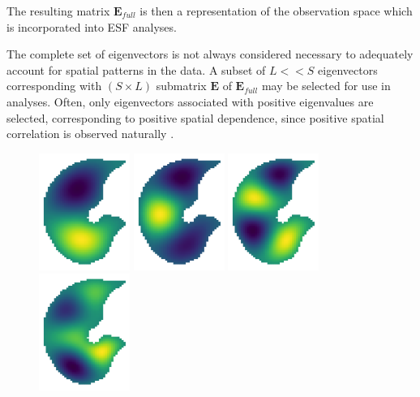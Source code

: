 \documentclass[12pt]{article}
\begin{document}
The resulting matrix $\mathbf{E}_{full}$ is then a representation of the observation space which is incorporated into ESF analyses.

The complete set of eigenvectors is not always considered necessary to adequately account for spatial patterns in the data. A subset of $L<<S$ eigenvectors corresponding with $(S\times L)$ submatrix $\mathbf{E}$ of $\mathbf{E}_{full}$ may be selected for use in analyses. Often, only eigenvectors associated with positive eigenvalues are selected, corresponding to positive spatial dependence, since positive spatial correlation is observed naturally \citep{griffith2014spatial, griffith2006spatial, chun2014quality}.


\begin{figure}
	\centering
	\includegraphics[height=1.5in]{EV1}
	\includegraphics[height=1.5in]{EV2}
	\includegraphics[height=1.5in]{EV3}
	\includegraphics[height=1.5in]{EV4}\\


\end{figure}
\end{document}
